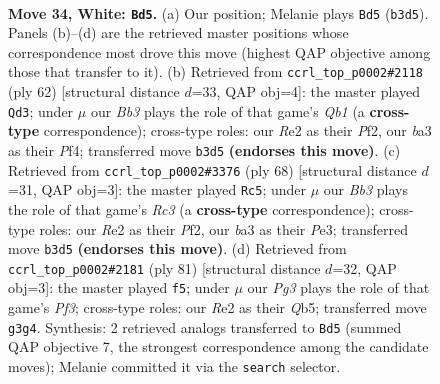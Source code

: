 \documentclass[11pt]{article}
\begin{document}
\clearpage

\begin{figure}[p]\centering
\begin{subfigure}{0.46\textwidth}\centering
\resizebox{\linewidth}{!}{%
\newchessgame
\chessboard[
  setfen={8/pp4kp/6p1/8/8/bB4P1/4RPKP/q7 w - - 2 34},
  showmover=false,
  pgfstyle=straightmove, color=movearrow, markmove={b3-d5}
]}
\caption{}
\end{subfigure}\hfill
\begin{subfigure}{0.46\textwidth}\centering
\resizebox{\linewidth}{!}{%
\newchessgame
\chessboard[
  setfen={q5k1/5pp1/8/7p/5P2/6P1/5P1P/1Q4K1 w - - 0 32},
  showmover=false,
  pgfstyle=straightmove, color=movearrow, markmove={b1-d3}
]}
\caption{}
\end{subfigure}
\\[4pt]
\begin{subfigure}{0.46\textwidth}\centering
\resizebox{\linewidth}{!}{%
\newchessgame
\chessboard[
  setfen={1r4k1/5pp1/8/7p/8/2R1P1P1/5P1P/6K1 w - - 0 35},
  showmover=false,
  pgfstyle=straightmove, color=movearrow, markmove={c3-c5}
]}
\caption{}
\end{subfigure}\hfill
\begin{subfigure}{0.46\textwidth}\centering
\resizebox{\linewidth}{!}{%
\newchessgame
\chessboard[
  setfen={6k1/B5p1/5p2/1q5p/8/2b2PP1/7P/3Q3K b - - 1 41},
  showmover=false,
  pgfstyle=straightmove, color=movearrow, markmove={f6-f5}
]}
\caption{}
\end{subfigure}
\caption{\textbf{Move 34, White: \texttt{Bd5}.} (a) Our position; Melanie plays \texttt{Bd5} (\texttt{b3d5}). Panels (b)--(d) are the retrieved master positions whose correspondence most drove this move (highest QAP objective among those that transfer to it). (b) Retrieved from \texttt{ccrl\_top\_p0002\#2118} (ply 62) [structural distance $d$=33, QAP obj=4]: the master played \texttt{Qd3}; under $\mu$ our \emph{Bb3} plays the role of that game's \emph{Qb1} (a \textbf{cross-type} correspondence); cross-type roles: our \emph{R}e2 as their \emph{P}f2, our \emph{b}a3 as their \emph{P}f4; transferred move \texttt{b3d5} \textbf{(endorses this move)}. (c) Retrieved from \texttt{ccrl\_top\_p0002\#3376} (ply 68) [structural distance $d$=31, QAP obj=3]: the master played \texttt{Rc5}; under $\mu$ our \emph{Bb3} plays the role of that game's \emph{Rc3} (a \textbf{cross-type} correspondence); cross-type roles: our \emph{R}e2 as their \emph{P}f2, our \emph{b}a3 as their \emph{P}e3; transferred move \texttt{b3d5} \textbf{(endorses this move)}. (d) Retrieved from \texttt{ccrl\_top\_p0002\#2181} (ply 81) [structural distance $d$=32, QAP obj=3]: the master played \texttt{f5}; under $\mu$ our \emph{Pg3} plays the role of that game's \emph{Pf3}; cross-type roles: our \emph{R}e2 as their \emph{Q}b5; transferred move \texttt{g3g4}. Synthesis: 2 retrieved analogs transferred to \texttt{Bd5} (summed QAP objective 7, the strongest correspondence among the candidate moves); Melanie committed it via the \texttt{search} selector.}
\label{fig:thought-m66}
\end{figure}
\end{document}
